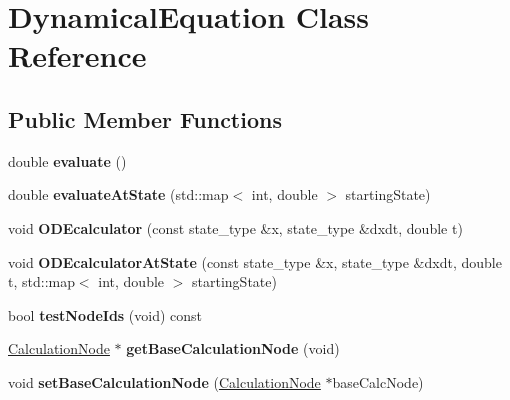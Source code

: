 \hypertarget{classDynamicalEquation}{}\section{Dynamical\+Equation Class Reference}
\label{classDynamicalEquation}
\subsection*{Public Member Functions}
\begin{DoxyCompactItemize}
\item 
double {\bfseries evaluate} ()\hypertarget{classDynamicalEquation_ac353d833e23a7718d28b48b96f273100}{}\label{classDynamicalEquation_ac353d833e23a7718d28b48b96f273100}

\item 
double {\bfseries evaluate\+At\+State} (std\+::map$<$ int, double $>$ starting\+State)\hypertarget{classDynamicalEquation_adf9454ebe570a95e2b4d72c04bdc82cc}{}\label{classDynamicalEquation_adf9454ebe570a95e2b4d72c04bdc82cc}

\item 
void {\bfseries O\+D\+Ecalculator} (const state\+\_\+type \&x, state\+\_\+type \&dxdt, double t)\hypertarget{classDynamicalEquation_a153f3c990807c596142b45d9f63ab57c}{}\label{classDynamicalEquation_a153f3c990807c596142b45d9f63ab57c}

\item 
void {\bfseries O\+D\+Ecalculator\+At\+State} (const state\+\_\+type \&x, state\+\_\+type \&dxdt, double t, std\+::map$<$ int, double $>$ starting\+State)\hypertarget{classDynamicalEquation_a07a6f24e0ca820c3734545c7d5d65927}{}\label{classDynamicalEquation_a07a6f24e0ca820c3734545c7d5d65927}

\item 
bool {\bfseries test\+Node\+Ids} (void) const \hypertarget{classDynamicalEquation_adbf7e8bad4b2764922b0ba2fe077b297}{}\label{classDynamicalEquation_adbf7e8bad4b2764922b0ba2fe077b297}

\item 
\hyperlink{classCalculationNode}{Calculation\+Node} $\ast$ {\bfseries get\+Base\+Calculation\+Node} (void)\hypertarget{classDynamicalEquation_aaa39d24b8dff72907638441db262c127}{}\label{classDynamicalEquation_aaa39d24b8dff72907638441db262c127}

\item 
void {\bfseries set\+Base\+Calculation\+Node} (\hyperlink{classCalculationNode}{Calculation\+Node} $\ast$base\+Calc\+Node)\hypertarget{classDynamicalEquation_a62f51fc853ccfa0aa2a09c3f2385eebe}{}\label{classDynamicalEquation_a62f51fc853ccfa0aa2a09c3f2385eebe}


\end{DoxyCompactItemize}
